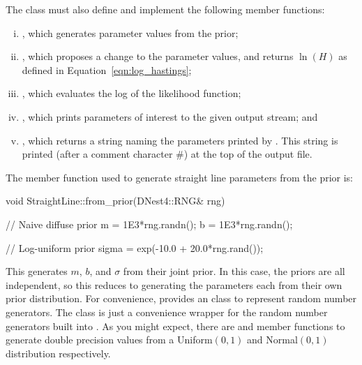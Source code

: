 \documentclass[article]{jss}
\begin{document}
The class must also define and implement the following member functions:
\begin{enumerate}[(i)]
\item {}, which generates parameter
        values from the prior;
\item {}, which proposes a
        change to the parameter values, and returns $\ln(H)$ as defined in
        Equation~\ref{eqn:log_hastings};
\item {}, which evaluates the log of
        the likelihood function;
\item {}, which prints parameters of
        interest to the given output stream; and
\item {}, which returns a 
        string naming the parameters printed by .
        This string is printed (after a comment character \#) at the top of
        the output file.
\end{enumerate}





The member function used to generate straight line parameters from the
prior is:

\begin{CodeChunk}
\begin{CodeInput}
void StraightLine::from_prior(DNest4::RNG& rng)
{
   // Naive diffuse prior
   m = 1E3*rng.randn();
   b = 1E3*rng.randn();

   // Log-uniform prior
   sigma = exp(-10.0 + 20.0*rng.rand());
}
\end{CodeInput}
\end{CodeChunk}

This generates $m$, $b$, and $\sigma$ from their joint prior. In this case,
the priors are all independent, so this reduces to generating the parameters
each from their own prior distribution. For convenience,
 provides an  class to represent random number
generators. The  class is just a convenience wrapper for the
random number generators built into .
As you might expect, there are
 and  member functions to generate
double precision values
from a Uniform$(0,1)$ and Normal$(0,1)$ distribution respectively.
\end{document}
